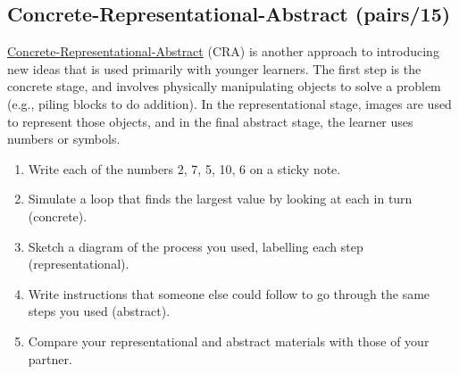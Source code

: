 \subsection*{Concrete-Representational-Abstract (pairs/15)}

\href{https://makingeducationfun.wordpress.com/2012/04/29/concrete-representational-abstract-cra/}{Concrete-Representational-Abstract} (CRA) is another approach to
introducing new ideas that is used primarily with younger
learners. The first step is the concrete stage, and involves
physically manipulating objects to solve a problem (e.g., piling
blocks to do addition). In the representational stage, images are
used to represent those objects, and in the final abstract stage, the
learner uses numbers or symbols.

\begin{enumerate}
\item
  Write each of the numbers 2, 7, 5, 10, 6 on a sticky note.
\item
  Simulate a loop that finds the largest value by looking at each in
  turn (concrete).
\item
  Sketch a diagram of the process you used, labelling each step
  (representational).
\item
  Write instructions that someone else could follow to go through the
  same steps you used (abstract).
\item
  Compare your representational and abstract materials with those of
  your partner.
\end{enumerate}

